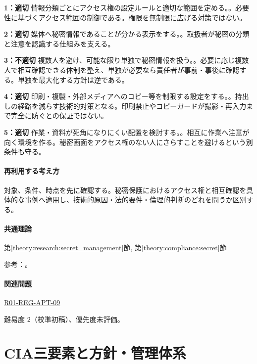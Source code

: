 \noindent\textbf{1：適切} 情報分類ごとにアクセス権の設定ルールと適切な範囲を定める。。必要性に基づくアクセス範囲の制御である。権限を無制限に広げる対策ではない。\par

\noindent\textbf{2：適切} 媒体へ秘密情報であることが分かる表示をする。。取扱者が秘密の分類と注意を認識する仕組みを支える。\par

\noindent\textbf{3：不適切} 複数人を避け、可能な限り単独で秘密情報を扱う。。必要に応じ複数人で相互確認できる体制を整え、単独が必要なら責任者が事前・事後に確認する。単独を最大化する方針は逆である。\par

\noindent\textbf{4：適切} 印刷・複製・外部メディアへのコピー等を制限する設定をする。。持出しの経路を減らす技術的対策となる。印刷禁止やコピーガードが撮影・再入力まで完全に防ぐとの保証ではない。\par

\noindent\textbf{5：適切} 作業・資料が死角になりにくい配置を検討する。。相互に作業へ注意が向く環境を作る。秘密画面をアクセス権のない人にさらすことを避けるという別条件も守る。\par

\paragraph{再利用する考え方} 対象、条件、時点を先に確認する。秘密保護におけるアクセス権と相互確認を具体的な事例へ適用し、技術的原因・法的要件・倫理的判断のどれを問うか区別する。

\paragraph{共通理論} \hyperref[theory:research:secret_management]{第\ref*{theory:research:secret_management}節}, \hyperref[theory:compliance:secret]{第\ref*{theory:compliance:secret}節}

\par 参考：\cite{meti_secret_handbook2024}。

\paragraph{関連問題} \hyperref[q:r01-reg-apt-09]{R01-REG-APT-09}

\par 難易度 2（校準初稿）、優先度未評価。

\section{CIA三要素と方針・管理体系}

